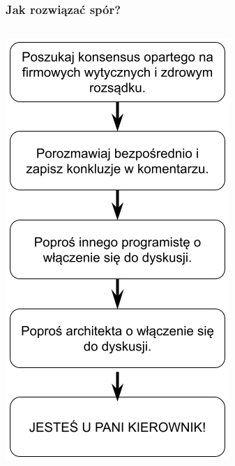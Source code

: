 \documentclass[xcolor=dvipsnames]{beamer}%
\begin{document}
\begin{frame}
\begin{columns}
\begin{column}{0.5\textwidth}
\begin{center}
			\end{center}
		\end{column}
	\end{columns}
\end{frame}

\begin{frame}
	\frametitle{Jak rozwiązać spór?}
	\begin{columns}
		\begin{column}{0.5\textwidth}
			\begin{center}
				\includegraphics[width=\textwidth,height=0.8\textheight,keepaspectratio]{figure/rozwiazywanie_sporu.png}

\end{center}
\end{column}
\end{columns}
\end{frame}
\end{document}
